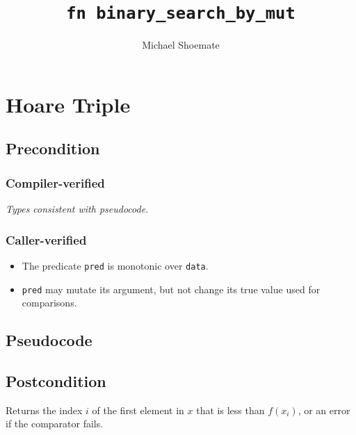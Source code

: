 \documentclass{article}
\title{\texttt{fn binary\_search\_by\_mut}}
\author{Michael Shoemate}
\begin{document}
\maketitle

\section{Hoare Triple}
\subsection*{Precondition}
\subsubsection*{Compiler-verified}
\textit{Types consistent with pseudocode.}

\subsubsection*{Caller-verified}
\begin{itemize}
    \item The predicate \texttt{pred} is monotonic over \texttt{data}.
    \item \texttt{pred} may mutate its argument, but not change its true value used for comparisons.
\end{itemize}

\subsection*{Pseudocode}
\label{sec:python-pseudocode}


\subsection*{Postcondition}

\begin{theorem}
    Returns the index $i$ of the first element in $x$ that is less than $f(x_i)$,
    or an error if the comparator fails.
\end{theorem}
\end{document}
